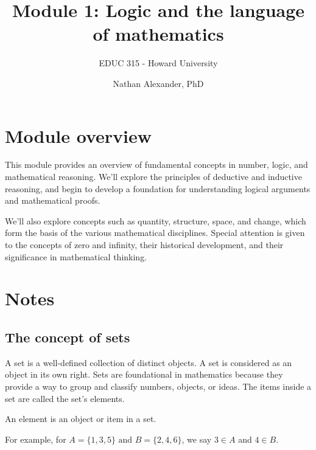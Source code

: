 \documentclass[
  letterpaper,
  DIV=11,
  numbers=noendperiod]{scrartcl}
\title{Module 1: Logic and the language of mathematics}
\subtitle{EDUC 315 - Howard University}
\author{Nathan Alexander, PhD}
\date{}
\begin{document}
\maketitle


\section{Module overview}\label{module-overview}

This module provides an overview of fundamental concepts in number,
logic, and mathematical reasoning. We'll explore the principles of
deductive and inductive reasoning, and begin to develop a foundation for
understanding logical arguments and mathematical proofs.

We'll also explore concepts such as quantity, structure, space, and
change, which form the basis of the various mathematical disciplines.
Special attention is given to the concepts of zero and infinity, their
historical development, and their significance in mathematical thinking.

\section{Notes}\label{notes}

\subsection{The concept of sets}\label{the-concept-of-sets}

A set is a well-defined collection of distinct objects. A set is
considered as an object in its own right. Sets are foundational in
mathematics because they provide a way to group and classify numbers,
objects, or ideas. The items inside a set are called the set's elements.

\begin{tcolorbox}[enhanced jigsaw, opacityback=0, colbacktitle=quarto-callout-tip-color!10!white, toptitle=1mm, breakable, toprule=.15mm, colframe=quarto-callout-tip-color-frame, leftrule=.75mm, coltitle=black, rightrule=.15mm, colback=white, titlerule=0mm, title=\textcolor{quarto-callout-tip-color}{\faLightbulb}\hspace{0.5em}{Elements}, arc=.35mm, opacitybacktitle=0.6, left=2mm, bottomrule=.15mm, bottomtitle=1mm]

An element is an object or item in a set.

For example, for \(A = \{1, 3, 5\} \text{ and } B = \{2, 4, 6\}\), we
say \(3 \in A\) and \(4 \in B\).

\end{tcolorbox}
\end{document}
